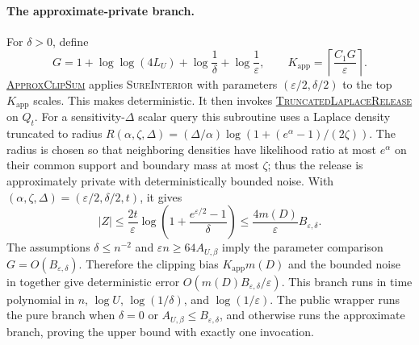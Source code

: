 \documentclass[11pt]{article}
\begin{document}
\paragraph{The approximate-private branch.}
For $\delta>0$, define
\[
 G=1+\log\log(4L_U)+\log\frac1\delta+\log\frac1\varepsilon,
 \qquad
 K_{\mathrm{app}}=\left\lceil\frac{C_1G}{\varepsilon}\right\rceil.
\]
\hyperref[alg:approx-clip-sum]{\textsc{ApproxClipSum}} applies
\textsc{SureInterior} with parameters $(\varepsilon/2,\delta/2)$ to the
top $K_{\mathrm{app}}$ scales.  This makes
 deterministic.  It then invokes
\hyperref[alg:truncated-laplace-release]{\textsc{TruncatedLaplaceRelease}}
on $Q_t$.  For a sensitivity-$\Delta$ scalar query this subroutine uses a
Laplace density truncated to radius
$R(\alpha,\zeta,\Delta)
=(\Delta/\alpha)\log(1+(e^\alpha-1)/(2\zeta))$.
The radius is chosen so that neighboring densities have likelihood ratio at
most $e^\alpha$ on their common support and boundary mass at most $\zeta$;
thus the release is approximately private with deterministically bounded
noise.  With
$(\alpha,\zeta,\Delta)=(\varepsilon/2,\delta/2,t)$, it gives
\begin{equation}
 |Z|\le
 \frac{2t}{\varepsilon}
 \log\left(1+\frac{e^{\varepsilon/2}-1}{\delta}\right)
 \le\frac{4m(D)}{\varepsilon}B_{\varepsilon,\delta}.
 \label{eq:overview-bounded-noise}
\end{equation}
The assumptions $\delta\le n^{-2}$ and
$\varepsilon n\ge64A_{U,\beta}$ imply the parameter comparison
$G=O(B_{\varepsilon,\delta})$.  Therefore the clipping bias
$K_{\mathrm{app}}m(D)$ and the bounded noise in
 together give deterministic error
$O(m(D)B_{\varepsilon,\delta}/\varepsilon)$.  This branch runs in time
polynomial in $n$, $\log U$, $\log(1/\delta)$, and
$\log(1/\varepsilon)$.  The public wrapper runs the pure branch when
$\delta=0$ or $A_{U,\beta}\le B_{\varepsilon,\delta}$, and otherwise runs
the approximate branch, proving the upper bound with exactly one invocation.
\end{document}
